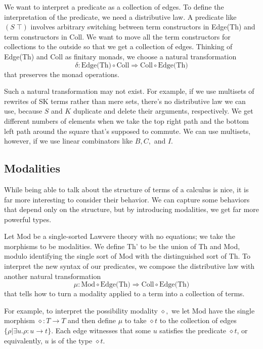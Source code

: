 \documentclass[a4paper,UKenglish]{article}
\newcommand{\maps}{\colon}
\begin{document}
We want to interpret a predicate as a collection of edges.  To define the interpretation of the predicate, we need a distributive law.  A predicate like $(S\; \top)$ involves arbitrary switching between term constructors in Edge(Th) and term constructors in Coll.  We want to move all the term constructors for collections to the outside so that we get a collection of edges.  Thinking of Edge(Th) and Coll as finitary monads, we choose a natural transformation
\[ \delta\maps \mbox{Edge(Th)}\circ\mbox{Coll} \Rightarrow \mbox{Coll}\circ\mbox{Edge(Th)} \]
that preserves the monad operations.

Such a natural transformation may not exist.  For example, if we use multisets of rewrites of SK terms rather than mere sets, there's no distributive law we can use, because $S$ and $K$ duplicate and delete their arguments, respectively.  We get different numbers of elements when we take the top right path and the bottom left path around the square that's supposed to commute.  We can use multisets, however, if we use linear combinators like $B,C,$ and $I.$

\subsection{Modalities}

While being able to talk about the structure of terms of a calculus is nice, it is far more interesting to consider their behavior.  We can capture some behaviors that depend only on the structure, but by introducing modalities, we get far more powerful types.

Let Mod be a single-sorted Lawvere theory with no equations; we take the morphisms to be modalities.  We define Th' to be the union of Th and Mod, modulo identifying the single sort of Mod with the distinguished sort of Th.  To interpret the new syntax of our predicates, we compose the distributive law with another natural transformation
\[ \mu\maps \mbox{Mod} \circ \mbox{Edge(Th)} \Rightarrow \mbox{Coll}\circ\mbox{Edge(Th)} \]
that tells how to turn a modality applied to a term into a collection of terms.

For example, to interpret the possibility modality $\diamond,$ we let Mod have the single morphism $\diamond\maps T \to T$ and then define $\mu$ to take $\diamond t$ to the collection of edges $\{ \rho | \exists u. \rho\maps u \to t \}.$  Each edge witnesses that some $u$ satisfies the predicate $\diamond t$, or equivalently, $u$ is of the type $\diamond t.$
\end{document}

